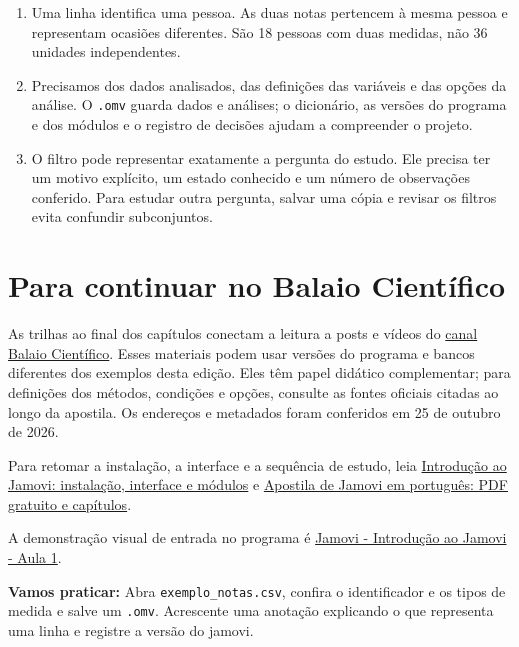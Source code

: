 \begin{enumerate}
  \item Uma linha identifica uma pessoa. As duas notas pertencem à mesma pessoa e representam ocasiões diferentes. São 18 pessoas com duas medidas, não 36 unidades independentes.
  \item Precisamos dos dados analisados, das definições das variáveis e das opções da análise. O \texttt{.omv} guarda dados e análises; o dicionário, as versões do programa e dos módulos e o registro de decisões ajudam a compreender o projeto.
  \item O filtro pode representar exatamente a pergunta do estudo. Ele precisa ter um motivo explícito, um estado conhecido e um número de observações conferido. Para estudar outra pergunta, salvar uma cópia e revisar os filtros evita confundir subconjuntos.
\end{enumerate}

\section{Para continuar no Balaio Científico}
\label{sec:trilhas-balaio}

As trilhas ao final dos capítulos conectam a leitura a posts e vídeos do \href{https://www.youtube.com/channel/UCzHAqwm3RSDM-YKdxd4XYTg}{canal Balaio Científico}. Esses materiais podem usar versões do programa e bancos diferentes dos exemplos desta edição. Eles têm papel didático complementar; para definições dos métodos, condições e opções, consulte as fontes oficiais citadas ao longo da apostila. Os endereços e metadados foram conferidos em 25 de outubro de 2026.


Para retomar a instalação, a interface e a sequência de estudo, leia \href{https://www.balaiocientifico.com/2026/10/introducao-ao-jamovi-instalacao.html}{Introdução ao Jamovi: instalação, interface e módulos} e \href{https://www.balaiocientifico.com/2022/11/apostila-de-jamovi.html}{Apostila de Jamovi em português: PDF gratuito e capítulos}.

A demonstração visual de entrada no programa é \href{https://www.youtube.com/watch?v=0zGH20Fa_JA}{Jamovi - Introdução ao Jamovi - Aula 1}.

\textbf{Vamos praticar:} Abra \texttt{exemplo\_notas.csv}, confira o identificador e os tipos de medida e salve um \texttt{.omv}. Acrescente uma anotação explicando o que representa uma linha e registre a versão do jamovi.
